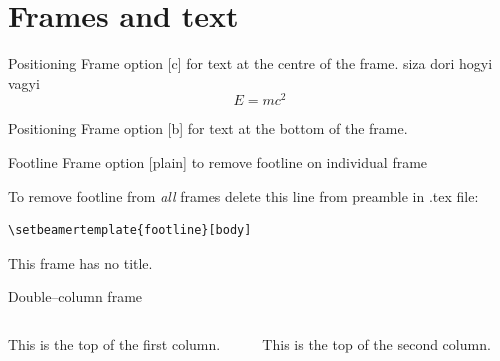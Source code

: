 \documentclass[11pt,t,aspectratio=1610,nofootline]{beamer}
\begin{document}

 
\section{Frames and text}
\begin{frame}[c]{Positioning}
Frame option [c] for text at the centre of the frame.
siza dori hogyi vagyi
\begin{equation}
	E=m c^2
\end{equation}
\end{frame}



\begin{frame}[b]{Positioning}
Frame option [b] for text at the bottom of the frame.

\vspace{8mm} %
\end{frame}




\begin{frame}{Footline}   %
\vspace{2.1mm} %
Frame option [plain] to remove footline on individual frame

\vspace{25pt}
To remove footline from \emph{all} frames delete this line from preamble in .tex file: 
\begin{verbatim}
\setbeamertemplate{footline}[body]
\end{verbatim}
\end{frame}




\begin{frame}
	This frame has no title.
\end{frame}




\begin{frame}{Double--column frame}
	\begin{columns}[t]
		\begin{column}{.5\textwidth}
			This is the top of the first column.	
		\end{column}
		\begin{column}{.5\textwidth}
			This is the top of the second column.
		\end{column}
	\end{columns}	
\end{frame}
\end{document}
